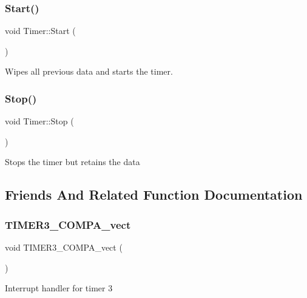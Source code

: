 \subsubsection{\texorpdfstring{Start()}{Start()}}
{\footnotesize\ttfamily void Timer\+::\+Start (\begin{DoxyParamCaption}{ }\end{DoxyParamCaption})}

Wipes all previous data and starts the timer. \hypertarget{class_timer_a6379e797f968aaee6ac3bb12dc6b81c5}{}\label{class_timer_a6379e797f968aaee6ac3bb12dc6b81c5} 
\subsubsection{\texorpdfstring{Stop()}{Stop()}}
{\footnotesize\ttfamily void Timer\+::\+Stop (\begin{DoxyParamCaption}{ }\end{DoxyParamCaption})}

Stops the timer but retains the data 

\subsection{Friends And Related Function Documentation}
\hypertarget{class_timer_a7aadba5fdadb4c3e5483845e75cdf5a1}{}\label{class_timer_a7aadba5fdadb4c3e5483845e75cdf5a1} 
\subsubsection{\texorpdfstring{T\+I\+M\+E\+R3\+\_\+\+C\+O\+M\+P\+A\+\_\+vect}{TIMER3\_COMPA\_vect}}
{\footnotesize\ttfamily void T\+I\+M\+E\+R3\+\_\+\+C\+O\+M\+P\+A\+\_\+vect (\begin{DoxyParamCaption}{ }\end{DoxyParamCaption})\hspace{0.3cm}{\ttfamily [friend]}}

Interrupt handler for timer 3 \hypertarget{class_timer_a53c4be4b5bb54690ef9012fde8d97b9c}{}\label{class_timer_a53c4be4b5bb54690ef9012fde8d97b9c} 
